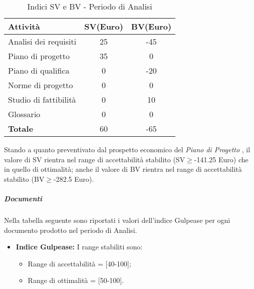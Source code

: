        
      \begin{table}[H]
        \centering
        \begin{tabular}{|l|c|c|}
          \hline
          \textbf{Attività} &\textbf{SV}(Euro)  &\textbf{BV}(Euro) \\
          \hline
          Analisi dei requisiti  &25 &-45  \\
          Piano di progetto &35  &0\\
          Piano di qualifica  &0  &-20\\
          Norme di progetto &0  &0 \\
          Studio di fattibilità &0  &10  \\
          Glossario &0  &0  \\
          \hline
          \textbf{Totale} &60  &-65  \\
          \hline
        \end{tabular}
        \caption{Indici SV e BV - Periodo di Analisi}
      \end{table}
      Stando a quanto preventivato dal prospetto economico del \emph{Piano di Progetto \VersionePP{}}, il valore di SV rientra nel range di accettabilità stabilito (SV\(\geq\)-141.25 Euro) che in quello di ottimalità;
      anche il valore di BV rientra nel range di accettabilità stabilito (BV\(\geq\)-282.5 Euro).
      
      \subparagraph{Documenti}
      Nella tabella seguente sono riportati i valori dell'indice Gulpease per ogni documento prodotto nel periodo di Analisi.\\

\begin{itemize}
\item \textbf{Indice Gulpease: }I range stabiliti sono:
      \begin{itemize}
        \item Range di accettabilità = [40-100];
        \item Range di ottimalità = [50-100].
      \end{itemize}
\end{itemize}      
      
